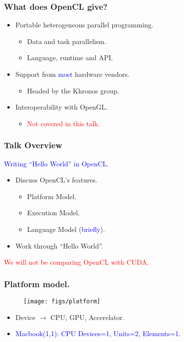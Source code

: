 \documentclass{beamer}
\begin{document}
\begin{frame}
\frametitle{What does OpenCL give?}
\begin{itemize}
  \item Portable heterogeneous parallel programming.
    \begin{itemize}
      \item Data and task parallelism.
      \item Language, runtime and API.
    \end{itemize}
  \item Support from \textcolor{blue}{most} hardware vendors.
    \begin{itemize}
      \item Headed by the Khronos group.
    \end{itemize}
  \item Interoperability with OpenGL.
    \begin{itemize}
    \item \textcolor{red}{Not covered in this talk.}
    \end{itemize}
\end{itemize}
\end{frame}

\begin{frame}
\frametitle{Talk Overview}


  \begin{center}
\textcolor{blue}{Writing ``Hello World'' in OpenCL.}
  \end{center}

  \begin{itemize}
  \item Discuss OpenCL's features.
    \begin{itemize}
    \item Platform Model.
    \item Execution Model.
    \item Language Model (\textcolor{blue}{briefly}).
    \end{itemize}
  \item Work through ``Hello World''.
  \end{itemize}

  \begin{center}
\textcolor{red}{We will not be comparing OpenCL with CUDA.}
  \end{center}


\end{frame}

\begin{frame}[fragile]
\frametitle{Platform model.}
  \begin{center}
  \begin{figure}
  \texttt{[image: figs/platform]}
  \end{figure}
  \end{center}
  \begin{itemize}
  \item Device $\rightarrow{}$ CPU, GPU, Accerelator.
  \item \textcolor{blue}{Macbook(1,1): CPU Devices=1, Units=2, Elements=1.}
  \end{itemize}
\end{frame}
\end{document}
